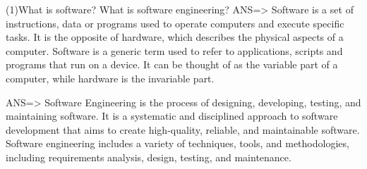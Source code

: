 (1)What is software? What is software engineering? 
ANS=>  Software is a set of instructions, data or programs used to operate 
 computers and execute specific tasks. It is the opposite of hardware, 
 which describes the physical aspects of a computer. Software is a generic
 term used to refer to applications, scripts and programs that run on a 
 device. It can be thought of as the variable part of a computer, while 
 hardware is the invariable part.

ANS=>  Software Engineering is the process of designing, developing, testing,
 and maintaining software. It is a systematic and disciplined approach 
 to software development that aims to create high-quality, reliable, 
 and maintainable software. Software engineering includes a variety of 
 techniques, tools, and methodologies, including requirements analysis,
 design, testing, and maintenance.

